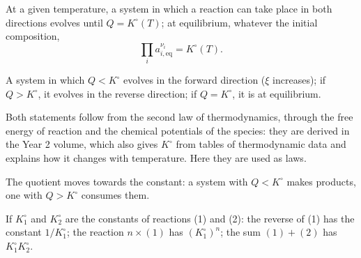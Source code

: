 \begin{theorem}\label{thm:b1:extent-q-and-k:mass-action}
At a given temperature, a system in which a reaction can take place in
both directions evolves until $Q = K^\circ(T)$; at equilibrium, whatever
the initial composition,
\[
  \prod_i a_{i,\text{eq}}^{\nu_i} = K^\circ(T) .
\]
\end{theorem}
\admitted

\begin{proposition}\label{prop:b1:extent-q-and-k:direction}
A system in which $Q < K^\circ$ evolves in the forward direction ($\xi$
increases); if $Q > K^\circ$, it evolves in the reverse direction; if
$Q = K^\circ$, it is at equilibrium.
\end{proposition}
\admitted

\begin{remark}\label{rem:b1:extent-q-and-k:origin}
Both statements follow from the second law of thermodynamics, through the
free energy of reaction and the chemical potentials of the species: they
are derived in the Year 2 volume, which also gives $K^\circ$ from tables
of thermodynamic data and explains how it changes with temperature. Here
they are used as laws.
\end{remark}

\begin{omfigure}

{\small The quotient moves towards the constant: a system with $Q <
K^\circ$ makes products, one with $Q > K^\circ$ consumes them.}
\end{omfigure}

\begin{proposition}\label{prop:b1:extent-q-and-k:combine-k}
If $K_1^\circ$ and $K_2^\circ$ are the constants of reactions (1) and (2):
the reverse of (1) has the constant $1/K_1^\circ$; the reaction $n \times
(1)$ has $(K_1^\circ)^n$; the sum $(1) + (2)$ has $K_1^\circ K_2^\circ$.
\end{proposition}

